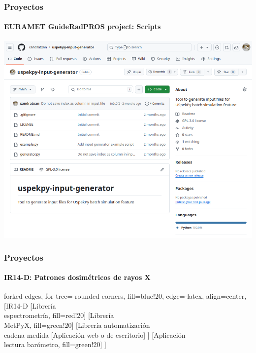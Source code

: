 \documentclass{beamer}
\begin{document}
	\begin{frame}
		\frametitle{Proyectos}
		\framesubtitle{EURAMET GuideRadPROS project: Scripts}
		\centering
		\includegraphics[width=\textwidth]{GRP_input}
	\end{frame}
	
	\begin{frame}
		\frametitle{Proyectos}
		\framesubtitle{IR14-D: Patrones dosimétricos de rayos X}
		\centering
		\small
		\begin{forest}
			forked edges,
			for tree={
				rounded corners,
				fill=blue!20,
				edge={-latex},
				align=center,
			}
			[IR14-D
				[Librería\\espectrometría, fill=red!20]
				[Librería\\MetPyX, fill=green!20]
				[Librería automatización\\cadena medida
					[Aplicación web o de escritorio]
				]
				[Aplicación\\lectura barómetro, fill=green!20]
			]
		\end{forest}
	\end{frame}
	
\end{document}
